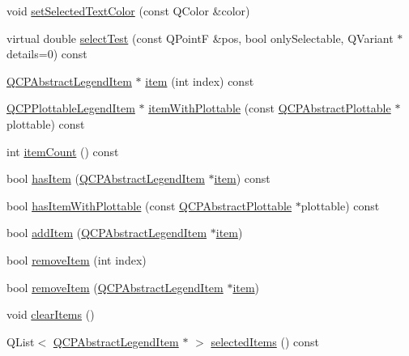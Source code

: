 \begin{DoxyCompactItemize}
\item 
void \hyperlink{class_q_c_p_legend_a7674dfc7a1f30e1abd1018c0ed45e0bc}{set\-Selected\-Text\-Color} (const Q\-Color \&color)
\item 
virtual double \hyperlink{class_q_c_p_legend_aa3892801051bc7b985e003576df844db}{select\-Test} (const Q\-Point\-F \&pos, bool only\-Selectable, Q\-Variant $\ast$details=0) const 
\item 
\hyperlink{class_q_c_p_abstract_legend_item}{Q\-C\-P\-Abstract\-Legend\-Item} $\ast$ \hyperlink{class_q_c_p_legend_a454272d7094437beb3278a2294006da5}{item} (int index) const 
\item 
\hyperlink{class_q_c_p_plottable_legend_item}{Q\-C\-P\-Plottable\-Legend\-Item} $\ast$ \hyperlink{class_q_c_p_legend_a5ee80cf83f65e3b6dd386942ee3cc1ee}{item\-With\-Plottable} (const \hyperlink{class_q_c_p_abstract_plottable}{Q\-C\-P\-Abstract\-Plottable} $\ast$plottable) const 
\item 
int \hyperlink{class_q_c_p_legend_a198228e9cdc78d3a3c306fa6763d0404}{item\-Count} () const 
\item 
bool \hyperlink{class_q_c_p_legend_a380dd19eb631592e1ebb9b24cc5b398a}{has\-Item} (\hyperlink{class_q_c_p_abstract_legend_item}{Q\-C\-P\-Abstract\-Legend\-Item} $\ast$\hyperlink{class_q_c_p_legend_a454272d7094437beb3278a2294006da5}{item}) const 
\item 
bool \hyperlink{class_q_c_p_legend_a2eb1d24bdf5658e64962a656303fd61a}{has\-Item\-With\-Plottable} (const \hyperlink{class_q_c_p_abstract_plottable}{Q\-C\-P\-Abstract\-Plottable} $\ast$plottable) const 
\item 
bool \hyperlink{class_q_c_p_legend_a3ab274de52d2951faea45a6d975e6b3f}{add\-Item} (\hyperlink{class_q_c_p_abstract_legend_item}{Q\-C\-P\-Abstract\-Legend\-Item} $\ast$\hyperlink{class_q_c_p_legend_a454272d7094437beb3278a2294006da5}{item})
\item 
bool \hyperlink{class_q_c_p_legend_ac91595c3eaa746fe6321d2eb952c63bb}{remove\-Item} (int index)
\item 
bool \hyperlink{class_q_c_p_legend_a2aea4ec6da2d454dd0b241a254d65082}{remove\-Item} (\hyperlink{class_q_c_p_abstract_legend_item}{Q\-C\-P\-Abstract\-Legend\-Item} $\ast$\hyperlink{class_q_c_p_legend_a454272d7094437beb3278a2294006da5}{item})
\item 
void \hyperlink{class_q_c_p_legend_a24795c7250eb5214fcea16b7217b4dfb}{clear\-Items} ()
\item 
Q\-List$<$ \hyperlink{class_q_c_p_abstract_legend_item}{Q\-C\-P\-Abstract\-Legend\-Item} $\ast$ $>$ \hyperlink{class_q_c_p_legend_ac93eaf236e911d67aa8b88942ef45c5e}{selected\-Items} () const 
\end{DoxyCompactItemize}

